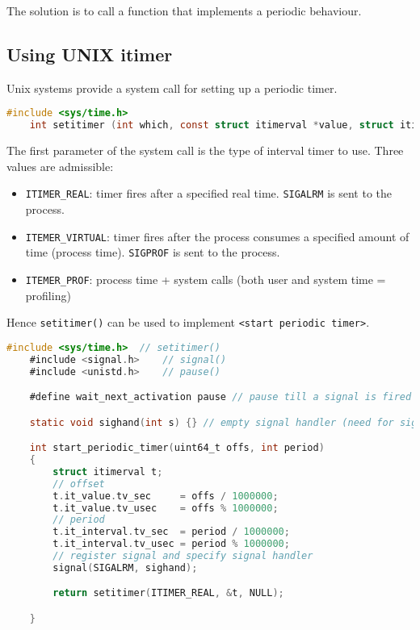 The solution is to call a function that implements a periodic behaviour.

\subsection{Using UNIX itimer}
Unix systems provide a system call for setting up a periodic timer.

\begin{lstlisting}[language=C]
    #include <sys/time.h>
    int setitimer (int which, const struct itimerval *value, struct itimerval *ovalue);
\end{lstlisting}
The first parameter of the system call is the type of interval timer to use. Three values are admissible:
\begin{itemize}
    \item \texttt{ITIMER\_REAL}: timer fires after a specified real time. \texttt{SIGALRM} is sent to the process.
    \item \texttt{ITEMER\_VIRTUAL}: timer fires after the process consumes a specified amount of time (process time). \texttt{SIGPROF} is sent to the process.
    \item \texttt{ITEMER\_PROF}: process time + system calls (both user and system time = profiling)
\end{itemize}

Hence \texttt{setitimer()} can be used to implement \texttt{<start periodic timer>}.

\begin{lstlisting}[language=C]
    #include <sys/time.h>  // setitimer()
    #include <signal.h>    // signal()
    #include <unistd.h>    // pause()

    #define wait_next_activation pause // pause till a signal is fired

    static void sighand(int s) {} // empty signal handler (need for signal())

    int start_periodic_timer(uint64_t offs, int period)
    {
        struct itimerval t;
        // offset
        t.it_value.tv_sec     = offs / 1000000;
        t.it_value.tv_usec    = offs % 1000000;
        // period
        t.it_interval.tv_sec  = period / 1000000;
        t.it_interval.tv_usec = period % 1000000;
        // register signal and specify signal handler
        signal(SIGALRM, sighand);

        return setitimer(ITIMER_REAL, &t, NULL);

    }
\end{lstlisting}

